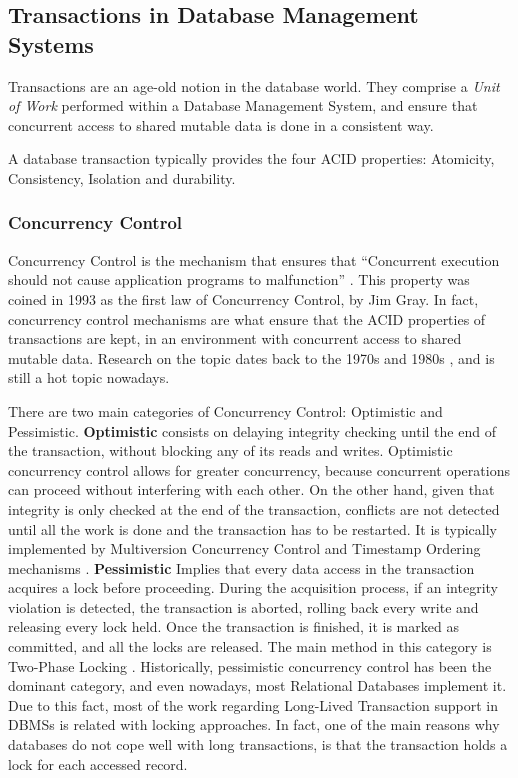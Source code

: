 \documentclass{llncs}
\begin{document}
\subsection{Transactions in Database Management Systems}
\label{sec:rdbms}

Transactions are an age-old notion in the database world. They
comprise a {\it Unit of Work} performed within a Database Management
System, and ensure that concurrent access to shared mutable data is
done in a consistent way.

A database transaction typically provides the four ACID properties:
Atomicity, Consistency, Isolation and durability.

\subsubsection{Concurrency Control}

Concurrency Control is the mechanism that ensures that ``Concurrent
execution should not cause application programs to malfunction''
\cite{reuter1993transaction}. This property was coined in 1993 as the
first law of Concurrency Control, by Jim Gray. In fact, concurrency
control mechanisms are what ensure that the ACID properties of
transactions are kept, in an environment with concurrent access to
shared mutable data. Research on the topic dates back to the 1970s
\cite{rosenkrantz1978system} and 1980s \cite{gray1981transaction}, and
is still a hot topic nowadays.

There are two main categories of Concurrency Control: Optimistic and
Pessimistic. {\bf Optimistic} consists on delaying integrity checking
until the end of the transaction, without blocking any of its reads
and writes.  Optimistic concurrency control allows for greater
concurrency, because concurrent operations can proceed without
interfering with each other. On the other hand, given that integrity
is only checked at the end of the transaction, conflicts are not
detected until all the work is done and the transaction has to be
restarted. It is typically implemented by Multiversion Concurrency
Control and Timestamp Ordering mechanisms \cite{Bernstein1981}. {\bf
  Pessimistic} Implies that every data access in the transaction
acquires a lock before proceeding. During the acquisition process, if
an integrity violation is detected, the transaction is aborted,
rolling back every write and releasing every lock held. Once the
transaction is finished, it is marked as committed, and all the locks
are released. The main method in this category is Two-Phase Locking
\cite{Bernstein1981}. Historically, pessimistic concurrency control
has been the dominant category, and even nowadays, most Relational
Databases implement it. Due to this fact, most of the work regarding
Long-Lived Transaction support in DBMSs is related with locking
approaches. In fact, one of the main reasons why databases do not cope
well with long transactions, is that the transaction holds a lock for
each accessed record.
\end{document}
